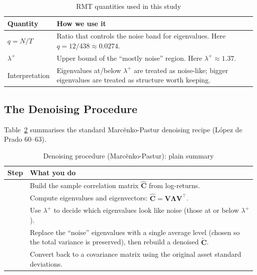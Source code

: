 \documentclass[11pt,a4paper]{article}
\begin{document}
\begin{table}[H]
\centering
\caption{RMT quantities used in this study}
\label{tab:rmt_params}
{\small\setlength{\tabcolsep}{4pt}\renewcommand{\arraystretch}{1.15}\begin{tabularx}{\textwidth}{>{\raggedright\arraybackslash}p{4.0cm} X}
\toprule
Quantity & How we use it \\
\midrule
$q = N/T$ & Ratio that controls the noise band for eigenvalues. Here $q = 12/438 \approx 0.0274$. \\
$\lambda^+$ & Upper bound of the ``mostly noise'' region. Here $\lambda^+ \approx 1.37$. \\
Interpretation & Eigenvalues at/below $\lambda^+$ are treated as noise-like; bigger eigenvalues are treated as structure worth keeping. \\
\bottomrule
\end{tabularx}}
\end{table}

\subsection{The Denoising Procedure}

Table~\ref{tab:denoise_steps} summarises the standard Marc\u{e}nko-Pastur denoising
recipe (L\'{o}pez de Prado 60--63).

\begin{table}[H]
\centering
\caption{Denoising procedure (Marc\u{e}nko-Pastur): plain summary}
\label{tab:denoise_steps}
{\small\setlength{\tabcolsep}{4pt}\renewcommand{\arraystretch}{1.15}\begin{tabularx}{\textwidth}{>{\raggedright\arraybackslash}p{2.0cm} X}
\toprule
Step & What you do \\
\midrule
1 & Build the sample correlation matrix $\hat{\bm{C}}$ from log-returns. \\
2 & Compute eigenvalues and eigenvectors: $\hat{\bm{C}} = \bm{V}\bm{\Lambda}\bm{V}^\top$. \\
3 & Use $\lambda^+$ to decide which eigenvalues look like noise (those at or below $\lambda^+$). \\
4 & Replace the ``noise'' eigenvalues with a single average level (chosen so the total variance is preserved), then rebuild a denoised $\tilde{\bm{C}}$. \\
5 & Convert back to a covariance matrix using the original asset standard deviations. \\
\bottomrule
\end{tabularx}}
\end{table}
\end{document}
